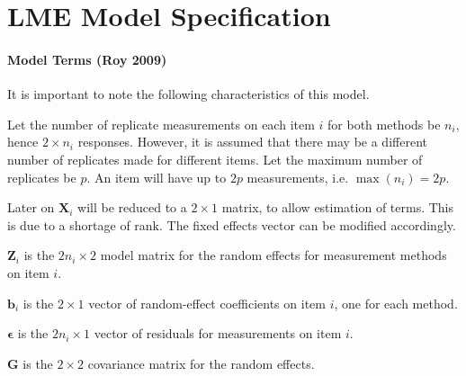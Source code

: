 \documentclass[12pt, a4paper]{report}
\theoremstyle{plain}
\theoremstyle{definition}
\theoremstyle{remark}
\begin{document}


\chapter{LME Model Specification}

\subsubsection{Model Terms (Roy 2009)}
It is important to note the following characteristics of this model.

Let the number of replicate measurements on each item $i$ for both methods be $n_i$, hence $2 \times n_i$ responses. However, it is assumed that there may be a different number of replicates made for different items. Let the maximum number of replicates be $p$. An item will have up to $2p$ measurements, i.e. $\max(n_{i}) = 2p$.


Later on $\boldsymbol{X}_i$ will be reduced to a $2 \times 1$ matrix, to allow estimation of terms. This is due to a shortage of rank. The fixed effects vector can be modified accordingly.

$\boldsymbol{Z}_i$ is the $2n_i \times  2$ model matrix for the random effects for measurement methods on item $i$.\\
\bigskip

$\boldsymbol{b}_i$ is the $2 \times  1$ vector of random-effect coefficients on item $i$, one for each method.

$\boldsymbol{\epsilon}$  is the $2n_i \times  1$ vector of residuals for measurements on item $i$.\\
\bigskip

$\boldsymbol{G}$ is the $2 \times  2$ covariance matrix for the random effects.
\end{document}
